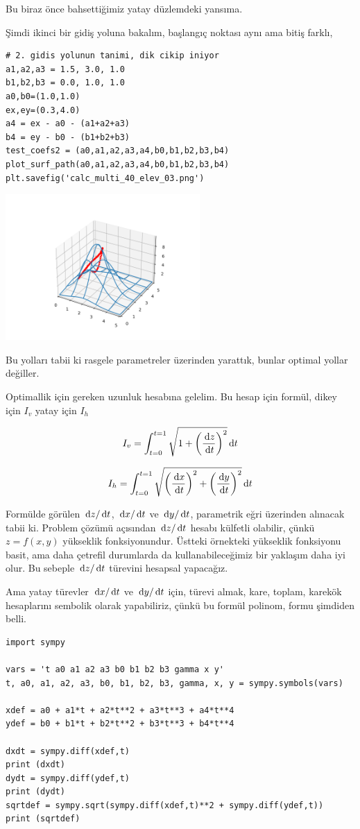 \documentclass[12pt,fleqn]{article}\usepackage{../../common}
\begin{document}
Bu biraz önce bahsettiğimiz yatay düzlemdeki yansıma.

Şimdi ikinci bir gidiş yoluna bakalım, başlangıç noktası aynı ama bitiş farklı,

\begin{verbatim}
# 2. gidis yolunun tanimi, dik cikip iniyor
a1,a2,a3 = 1.5, 3.0, 1.0
b1,b2,b3 = 0.0, 1.0, 1.0
a0,b0=(1.0,1.0)
ex,ey=(0.3,4.0)
a4 = ex - a0 - (a1+a2+a3)
b4 = ey - b0 - (b1+b2+b3)
test_coefs2 = (a0,a1,a2,a3,a4,b0,b1,b2,b3,b4)
plot_surf_path(a0,a1,a2,a3,a4,b0,b1,b2,b3,b4)
plt.savefig('calc_multi_40_elev_03.png')
\end{verbatim}

\includegraphics[width=20em]{calc_multi_40_elev_03.png}

Bu yolları tabii ki rasgele parametreler üzerinden yarattık, bunlar optimal
yollar değiller.

Optimallik için gereken uzunluk hesabına gelelim. Bu hesap için
formül, dikey için $I_v$ yatay için $I_h$

$$
I_v = \int_{t=0}^{t=1} \sqrt{1 + \left(\frac{\,\mathrm{d} z}{\,\mathrm{d} t} \right)^2 } \,\mathrm{d} t
$$

$$
I_h = \int_{t=0}^{t=1} \sqrt{
\left(\frac{\,\mathrm{d} x}{\,\mathrm{d} t} \right)^2 + 
\left(\frac{\,\mathrm{d} y}{\,\mathrm{d} t} \right)^2
} 
\,\mathrm{d} t
$$


Formülde görülen $\,\mathrm{d} z/\,\mathrm{d} t$, $\,\mathrm{d} x/\,\mathrm{d} t$ ve $\,\mathrm{d} y/\,\mathrm{d} t$, parametrik eğri
üzerinden alınacak tabii ki. Problem çözümü açısından $\,\mathrm{d} z/\,\mathrm{d} t$ hesabı
külfetli olabilir, çünkü $z = f(x,y)$ yükseklik fonksiyonundur. Üstteki
örnekteki yükseklik fonksiyonu basit, ama daha çetrefil durumlarda da
kullanabileceğimiz bir yaklaşım daha iyi olur. Bu sebeple $\,\mathrm{d} z/\,\mathrm{d} t$ türevini
hesapsal yapacağız.

Ama yatay türevler $\,\mathrm{d} x/\,\mathrm{d} t$ ve $\,\mathrm{d} y/\,\mathrm{d} t$ için, türevi almak, kare,
toplam, karekök hesaplarını sembolik olarak yapabiliriz, çünkü bu formül
polinom, formu şimdiden belli.

\begin{verbatim}
import sympy

vars = 't a0 a1 a2 a3 b0 b1 b2 b3 gamma x y'
t, a0, a1, a2, a3, b0, b1, b2, b3, gamma, x, y = sympy.symbols(vars)

xdef = a0 + a1*t + a2*t**2 + a3*t**3 + a4*t**4
ydef = b0 + b1*t + b2*t**2 + b3*t**3 + b4*t**4

dxdt = sympy.diff(xdef,t)
print (dxdt)
dydt = sympy.diff(ydef,t)
print (dydt)
sqrtdef = sympy.sqrt(sympy.diff(xdef,t)**2 + sympy.diff(ydef,t))
print (sqrtdef)
\end{verbatim}
\end{document}
